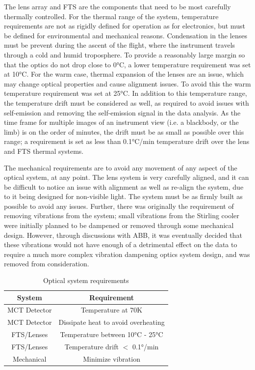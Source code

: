 The lens array and FTS are the components that need to be most carefully thermally controlled. For the thermal range of the system, temperature requirements are not as rigidly defined for operation as for electronics, but must be defined for environmental and mechanical reasons. Condensation in the lenses must be prevent during the ascent of the flight, where the instrument travels through a cold and humid troposphere. To provide a reasonably large margin so that the optics do not drop close to 0°C, a lower temperature requirement was set at 10°C. For the warm case, thermal expansion of the lenses are an issue, which may change optical properties and cause alignment issues. To avoid this the warm temperature requirement was set at 25°C. In addition to this temperature range, the temperature drift must be considered as well, as required to avoid issues with self-emission and removing the self-emission signal in the data analysis. As the time frame for multiple images of an instrument view (i.e. a blackbody, or the limb) is on the order of minutes, the drift must be as small as possible over this range; a requirement is set as less than 0.1°C/min temperature drift over the lens and FTS thermal systems. 

The mechanical requirements are to avoid any movement of any aspect of the optical system, at any point. The lens system is very carefully aligned, and it can be difficult to notice an issue with alignment as well as re-align the system, due to it being designed for non-visible light. The system must be as firmly built as possible to avoid any issues. Further, there was originally the requirement of removing vibrations from the system; small vibrations from the Stirling cooler were initially planned to be dampened or removed through some mechanical design. However, through discussions with ABB, it was eventually decided that these vibrations would not have enough of a detrimental effect on the data to require a much more complex vibration dampening optics system design, and was removed from consideration.

\begin{table}[h]
\begin{center}
\begin{tabular}{ |c|c| }
 \hline
 \rowcolor{lightgray}
 System & Requirement\\
  \hline
  \hline
  MCT Detector & Temperature at 70K\\
 \hline
  MCT Detector & Dissipate heat to avoid overheating\\
 \hline
 FTS/Lenses & Temperature between 10°C - 25°C\\
 \hline
 FTS/Lenses & Temperature drift $<$ 0.1°/min\\
 \hline
 Mechanical & Minimize vibration\\
 \hline
\end{tabular}
\end{center}
\caption{Optical system requirements}
 \label{optics_req_table}
\end{table}

